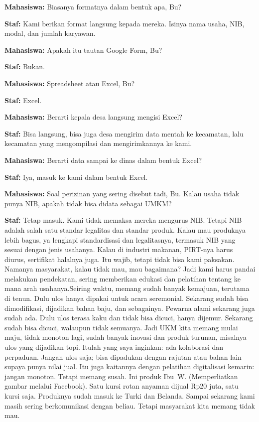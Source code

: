 {\noindent \textbf{Mahasiswa:} Biasanya formatnya dalam bentuk apa, Bu?

\noindent \textbf{Staf:} Kami berikan format langsung  kepada mereka. Isinya nama usaha, NIB, modal, dan jumlah karyawan.

\noindent \textbf{Mahasiswa:} Apakah itu tautan Google Form, Bu?

\noindent \textbf{Staf:} Bukan.

\noindent \textbf{Mahasiswa:} Spreadsheet atau Excel, Bu?

\noindent \textbf{Staf:} Excel.

\noindent \textbf{Mahasiswa:} Berarti kepala desa langsung mengisi Excel?

\noindent \textbf{Staf:} Bisa langsung, bisa juga desa mengirim data mentah ke kecamatan, lalu kecamatan yang mengompilasi dan mengirimkannya ke kami.

\noindent \textbf{Mahasiswa:} Berarti data sampai ke dinas dalam bentuk Excel?

\noindent \textbf{Staf:} Iya, masuk ke kami dalam bentuk Excel.

\noindent \textbf{Mahasiswa:} Soal perizinan yang sering disebut tadi, Bu. Kalau usaha tidak punya NIB, apakah tidak bisa didata sebagai UMKM?

\noindent \textbf{Staf:} Tetap masuk. Kami tidak memaksa mereka mengurus NIB. Tetapi NIB adalah salah satu standar legalitas dan standar produk. Kalau mau produknya lebih bagus, ya lengkapi standardisasi dan legalitasnya, termasuk NIB yang sesuai dengan jenis usahanya. Kalau di industri makanan, PIRT-nya harus diurus, sertifikat halalnya juga. Itu wajib, tetapi tidak bisa kami paksakan. Namanya masyarakat, kalau tidak mau, mau bagaimana? Jadi kami harus pandai melakukan pendekatan, sering memberikan edukasi dan pelatihan tentang ke mana arah usahanya.Seiring waktu, memang sudah banyak kemajuan, terutama di tenun. Dulu ulos hanya dipakai untuk acara seremonial. Sekarang sudah bisa dimodifikasi, dijadikan bahan baju, dan sebagainya. Pewarna alami sekarang juga sudah ada. Dulu ulos terasa kaku dan tidak bisa dicuci, hanya dijemur. Sekarang sudah bisa dicuci, walaupun tidak semuanya. Jadi UKM kita memang mulai maju, tidak monoton lagi, sudah banyak inovasi dan produk turunan, misalnya ulos yang dijadikan topi. Itulah yang saya inginkan: ada kolaborasi dan perpaduan. Jangan ulos saja; bisa dipadukan dengan rajutan atau bahan lain supaya punya nilai jual. Itu juga kaitannya dengan pelatihan digitalisasi kemarin: jangan monoton. Tetapi memang susah. Ini produk Ibu~W. (Memperliatkan gambar melalui Facebook). Satu kursi rotan anyaman dijual Rp20 juta, satu kursi saja. Produknya sudah masuk ke Turki dan Belanda. Sampai sekarang kami masih sering berkomunikasi dengan beliau. Tetapi masyarakat kita memang tidak mau.

}
